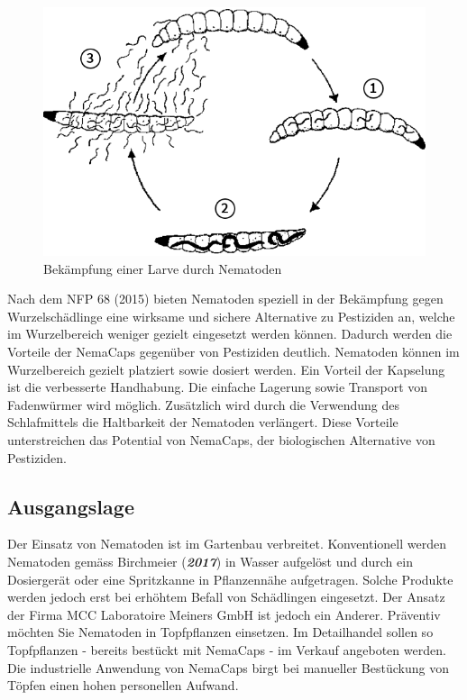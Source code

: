 \begin{figure}
	\includegraphics[scale=0.4]{Illustrationen/3-Einleitung/zyklus_nematoden.png}
\caption{Bekämpfung einer Larve durch Nematoden}
\label{fig:zyklus_Nematoden}
\end{figure}

	
Nach dem NFP 68 (2015) bieten Nematoden speziell in der Bekämpfung gegen Wurzelschädlinge eine wirksame und sichere Alternative zu Pestiziden an, welche im Wurzelbereich weniger gezielt eingesetzt werden können. Dadurch werden die Vorteile der NemaCaps gegenüber von Pestiziden deutlich. Nematoden können im Wurzelbereich gezielt platziert sowie dosiert werden. Ein Vorteil der Kapselung ist die verbesserte Handhabung. Die einfache Lagerung sowie Transport von Fadenwürmer wird möglich.  Zusätzlich wird durch die Verwendung des Schlafmittels die Haltbarkeit der Nematoden verlängert. Diese Vorteile unterstreichen das Potential von NemaCaps, der biologischen Alternative von Pestiziden.

\subsection{Ausgangslage}
Der Einsatz von Nematoden ist im Gartenbau verbreitet. Konventionell werden Nematoden gemäss Birchmeier (\textbf{\textit{2017}}) in Wasser aufgelöst und durch ein Dosiergerät oder eine Spritzkanne in Pflanzennähe aufgetragen. Solche Produkte werden jedoch erst bei erhöhtem Befall von Schädlingen eingesetzt. Der Ansatz der Firma MCC Laboratoire Meiners GmbH ist jedoch ein Anderer. Präventiv möchten Sie Nematoden in Topfpflanzen einsetzen. Im Detailhandel sollen so Topfpflanzen - bereits bestückt mit NemaCaps - im Verkauf angeboten werden.
\newline
Die industrielle Anwendung von NemaCaps birgt bei manueller Bestückung von Töpfen einen hohen personellen Aufwand. 